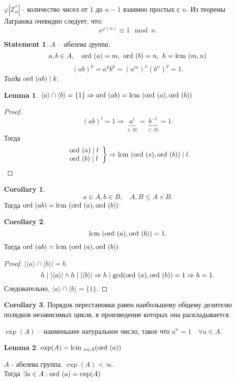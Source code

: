 \documentclass[11pt]{book}
\newcommand{\Z}{\mathbb{Z}}
\newcommand{\ord}{{\mathop{\text{\rm ord}}}~}
\newcommand{\lcm}{{\mathop{\text{\rm lcm}}}~}
\theoremstyle{definition}
\theoremstyle{plain}
\theoremstyle{plain}
\newtheorem*{lm}{Lemma}
\newtheorem*{st}{Statement}
\theoremstyle{definition}
\newtheorem*{cor}{Corollary}
\theoremstyle{remark}
\begin{document}
$\varphi |\Z_n^*|$ - количество чисел от $1$ до $n-1$ взаимно простых с $n$.
Из теоремы Лагранжа очевидно следует, что:
\[
    x^{\varphi(n)} \equiv 1 \mod n
.\] 
\begin{st}
    $A$ -- абелева группа.
    $$a, b \in  A, \quad \ord(a) = m, ~\ord(b) = n, ~h = \lcm(m, n)$$
    \[
	(ab)^k = a^k b^k = (a^m)^x (b^n)^y = 1
    .\] 
    Тогда $\ord(ab) \mid k$.
\end{st}
\begin{lm}
    $\langle a \rangle \cap \langle b \rangle =\{1\} \Rightarrow \ord(ab) = \lcm(\ord (a) , \ord(b))$
\end{lm}
\begin{proof}
    \[
	(ab)^l = 1 \Rightarrow \underbrace{a^l}_{\in \langle b \rangle}  = \underbrace{b^{-l}}_{\in \langle b \rangle } = 1
    .\] 
    Тогда \[
    \left . 
    \begin{array}{ll}
	\ord(a) \mid l \\
	\ord(b) \mid l
    \end{array}
\right \} \Rightarrow  \lcm(\ord(s), \ord(b)) \mid l
    .\] 
\end{proof}
\begin{cor}
    \[
    a \in  A, b \in  B, \quad  A,B \le A\times B 
    .\] 
    Тогда $\ord(ab) = \lcm(\ord(a), \ord(b))$
\end{cor}
\begin{cor}
    \[
	\lcm(\ord(a) ,\ord(b)) = 1 
    .\] 
    Тогда $\ord(ab) = \lcm(\ord(a), \ord(b))$
\end{cor}
\begin{proof}
    $ | \langle a \rangle \cap \langle b \rangle | = h$
    \[
	h \mid |\langle a \rangle| \wedge h \mid |\langle b \rangle| \Rightarrow h \mid \gcd(\ord(a), \ord(b)) = 1 \Rightarrow  h =1
    .\] 
    Следовательно, $\langle a \rangle \cap \langle b \rangle =\{1\}$.
\end{proof}
\begin{cor}
    Порядок перестановки равен наибольшему общему делителю полядков независимых циклв, в произведение которых она раскладывается.
\end{cor}
\begin{defn}
    $\exp(A)$ -- наименьшее натуральное число, такое что $a^n = 1 \quad \forall a \in  A$.
\end{defn}
\begin{lm}
    $\exp(A) = \lcm _{a \in A} (\ord(a))$
\end{lm}
\begin{thm}
    $A$ - абелева группа. $\exp(A) < \infty$.\\
    Тогда  $\exists a \in  A: \ord(a) = \exp(A)$
\end{thm}
\end{document}
